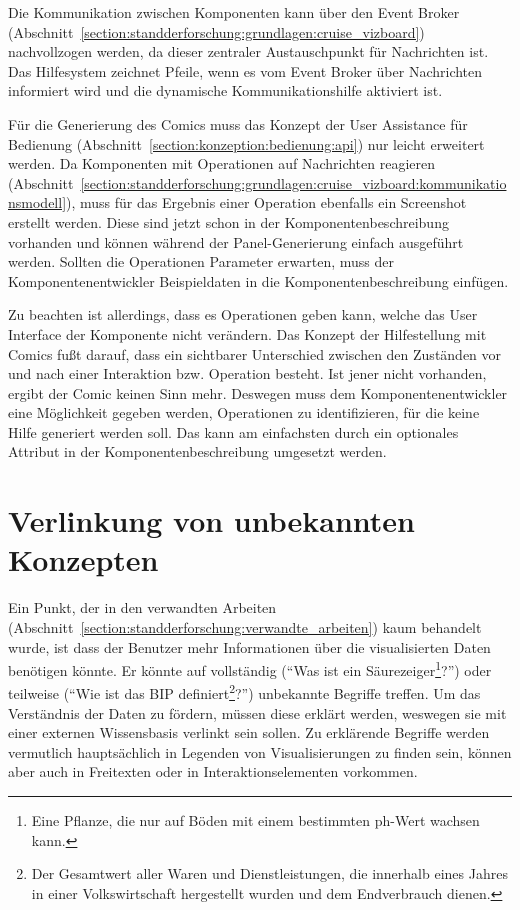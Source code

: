 \documentclass[
	headsepline,
	footsepline,
	fontsize=12pt,
	bibliography=totoc
]{scrbook}
\begin{document}
Die Kommunikation zwischen Komponenten kann über den Event Broker (Abschnitt~\ref{section:standderforschung:grundlagen:cruise_vizboard}) nachvollzogen werden, da dieser zentraler Austauschpunkt für Nachrichten ist. Das Hilfesystem zeichnet Pfeile, wenn es vom Event Broker über Nachrichten informiert wird und die dynamische Kommunikationshilfe aktiviert ist.

Für die Generierung des Comics muss das Konzept der User Assistance für Bedienung (Abschnitt~\ref{section:konzeption:bedienung:api}) nur leicht erweitert werden. Da Komponenten mit Operationen auf Nachrichten reagieren (Abschnitt~\ref{section:standderforschung:grundlagen:cruise_vizboard:kommunikationsmodell}), muss für das Ergebnis einer Operation ebenfalls ein Screenshot erstellt werden. Diese sind jetzt schon in der Komponentenbeschreibung vorhanden und können während der Panel-Generierung einfach ausgeführt werden. Sollten die Operationen Parameter erwarten, muss der Komponentenentwickler Beispieldaten in die Komponentenbeschreibung einfügen.

Zu beachten ist allerdings, dass es Operationen geben kann, welche das User Interface der Komponente nicht verändern. Das Konzept der Hilfestellung mit Comics fußt darauf, dass ein sichtbarer Unterschied zwischen den Zuständen vor und nach einer Interaktion bzw. Operation besteht. Ist jener nicht vorhanden, ergibt der Comic keinen Sinn mehr. Deswegen muss dem Komponentenentwickler eine Möglichkeit gegeben werden, Operationen zu identifizieren, für die keine Hilfe generiert werden soll. Das kann am einfachsten durch ein optionales Attribut in der Komponentenbeschreibung umgesetzt werden.

\section{Verlinkung von unbekannten Konzepten}
\label{section:konzeption:verlinkung}


Ein Punkt, der in den verwandten Arbeiten (Abschnitt~\ref{section:standderforschung:verwandte_arbeiten}) kaum behandelt wurde, ist dass der Benutzer mehr Informationen über die visualisierten Daten benötigen könnte. Er könnte auf vollständig (\enquote{Was ist ein Säurezeiger\footnote{Eine Pflanze, die nur auf Böden mit einem bestimmten ph-Wert wachsen kann.}?}) oder teilweise (\enquote{Wie ist das BIP definiert\footnote{Der Gesamtwert aller Waren und Dienstleistungen, die innerhalb eines Jahres in einer Volkswirtschaft hergestellt wurden und dem Endverbrauch dienen.}?}) unbekannte Begriffe treffen. Um das Verständnis der Daten zu fördern, müssen diese erklärt werden, weswegen sie mit einer externen Wissensbasis verlinkt sein sollen. Zu erklärende Begriffe werden vermutlich hauptsächlich in Legenden von Visualisierungen zu finden sein, können aber auch in Freitexten oder in Interaktionselementen vorkommen.
\end{document}
